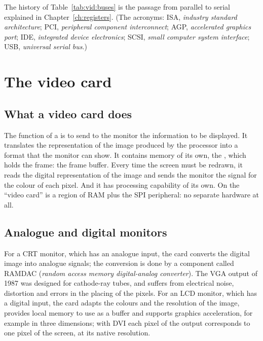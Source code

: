 The history of Table~\ref{tab:vid:buses} is the passage from parallel to
serial explained in Chapter~\ref{ch:registers}. (The acronyms: ISA,
\emph{industry standard architecture}; PCI, \emph{peripheral component
interconnect}; AGP, \emph{accelerated graphics port}; IDE, \emph{integrated
device electronics}; SCSI, \emph{small computer system interface}; USB,
\emph{universal serial bus}.)

\section{The video card}

\subsection{What a video card does}

The function of a  is to send to the monitor the information
to be displayed. It translates the representation of the image produced by
the processor into a format that the monitor can show. It contains memory of
its own, the , which holds the frame: the frame buffer.
Every time the screen must be redrawn, it reads the digital representation of
the image and sends the monitor the signal for the colour of each pixel. And
it has processing capability of its own. On \prg the ``video card'' is a
region of RAM plus the SPI peripheral: no separate hardware at all.

\subsection{Analogue and digital monitors}

For a CRT monitor, which has an analogue input, the card converts the digital
image into analogue signals; the conversion is done by a component called
RAMDAC (\emph{random access memory digital-analog converter}). The VGA output
of 1987 was designed for cathode-ray tubes, and suffers from electrical noise,
distortion and errors in the placing of the pixels. For an LCD monitor, which
has a digital input, the card adapts the colours and the resolution of the
image, provides local memory to use as a buffer and supports graphics
acceleration, for example in three dimensions; with DVI each pixel of the
output corresponds to one pixel of the screen, at its native resolution.


